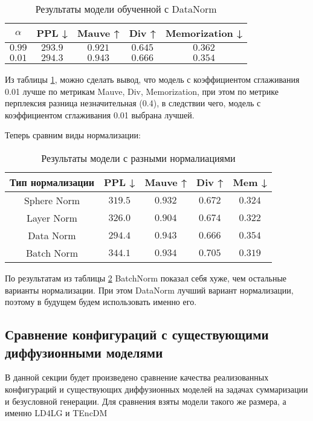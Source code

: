 \documentclass[12pt,a4paper]{article}
\begin{document}
\begin{table}[h!]
\caption{Результаты модели обученной с DataNorm}
\centering
\begin{tabular}{|c|c|c|c|c|}
\hline
$\alpha$ & PPL ↓ & Mauve ↑ & Div ↑ & Memorization ↓ \\ \hline
$0.99$ & $293.9$ & $0.921$ & $0.645$ & $0.362$ \\ \hline
$0.01$ & $294.3$ & $0.943$ & $0.666$ & $0.354$ \\ \hline
\end{tabular}
\label{table:4.4}
\end{table}
Из таблицы \ref{table:4.4}, можно сделать вывод, что модель с коэффициентом сглаживания 0.01 лучше по метрикам Mauve, Div, Memorization, при этом по метрике перплексия разница незначительная (0.4), в следствии чего, модель с коэффициентом сглаживания 0.01 выбрана лучшей.

Теперь сравним виды нормализации:
\begin{table}[h!]
\caption{Результаты модели с разными нормалиациями}
\centering
\begin{tabular}{|c|c|c|c|c|}
\hline
Тип нормализации & PPL ↓ & Mauve ↑ & Div ↑ & Mem ↓ \\ \hline
Sphere Norm & $319.5$ & $0.932$ & $0.672$ & $0.324$ \\ \hline
Layer Norm & $326.0$ & $0.904$ & $0.674$ & $0.322$ \\ \hline
Data Norm & $294.4$ & $0.943$ & $0.666$ & $0.354$ \\ \hline
Batch Norm & $344.1$ & $0.934$ & $0.705$ & $0.319$ \\ \hline
\end{tabular}
\label{tab:5}
\end{table}
По результатам из таблицы \ref{tab:5} BatchNorm показал себя хуже, чем остальные варианты нормализации. При этом DataNorm лучший вариант нормализации, поэтому в будущем будем использовать именно его. 

\subsection{Сравнение конфигураций с существующими диффузионными моделями}

В данной секции будет произведено сравнение качества реализованных конфигураций и существующих диффузионных моделей на задачах суммаризации и безусловной генерации. Для сравнения взяты модели такого же размера, а именно LD4LG \cite{lovelace2023latentdiffusionlanguagegeneration} и TEncDM \cite{shabalin2024tencdmunderstandingpropertiesdiffusion}
\end{document}
